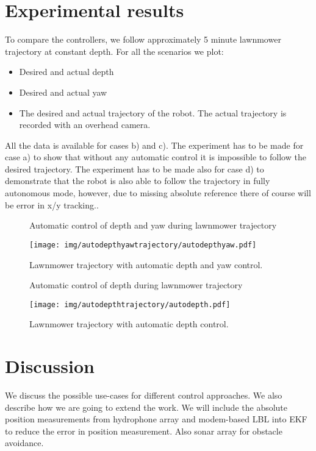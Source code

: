 \documentclass[conference]{IEEEtran}
\begin{document}
\section{Experimental results}
To compare the controllers, we follow approximately 5 minute lawnmower trajectory at constant depth. For all the scenarios we plot:

\begin{itemize}
	\item
Desired and actual depth
	\item
Desired and actual yaw
	\item
The desired and actual trajectory of the robot. 
The actual trajectory is recorded with an overhead camera.
\end{itemize}

All the data is available for cases b) and c). The experiment has to be made for case a) to show that without any automatic control it is impossible to follow the desired trajectory. The experiment has to be made also for case d) to demonstrate that the robot is also able to follow the trajectory in fully autonomous mode, however, due to missing absolute reference there of course will be error in x/y tracking..


\begin{figure} 
	\centering 
	 
	\caption{Automatic control of depth and yaw during lawnmower trajectory} \label{fig:autodepthyawplot} 
\end{figure}

\begin{figure}[!t]
\centering
\texttt{[image: img/autodepthyawtrajectory/autodepthyaw.pdf]}
\caption{Lawnmower trajectory with automatic depth and yaw control.}
\label{autodepthyawtrajectory}
\end{figure}

\begin{figure} 
	\centering 
	 
	\caption{Automatic control of depth during lawnmower trajectory} \label{fig:autodepthplot} 
\end{figure}

\begin{figure}[!t]
\centering
\texttt{[image: img/autodepthtrajectory/autodepth.pdf]}
\caption{Lawnmower trajectory with automatic depth control.}
\label{autodepthtrajectory}
\end{figure}



\section{Discussion}
We discuss the possible use-cases for different control approaches. We also describe how we are going to extend the work. We will include the absolute position measurements from hydrophone array and modem-based LBL into EKF to reduce the error in position measurement. Also sonar array for obstacle avoidance. 
\end{document}
